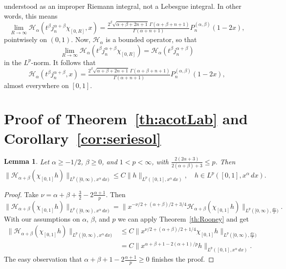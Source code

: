\documentclass[12pt,leqno]{amsart}
\theoremstyle{plain}
\newtheorem{Lem}[Thm]{Lemma}
\newcommand{\htr}{\mathcal{H}} %
\newcommand{\htra}{\mathcal{H}_\alpha} %
\begin{document}
understood as an improper Riemann integral, not a Lebesgue integral. In other
words, this means
\begin{equation*}
   \lim_{R\to\infty} \htra(t^\beta j_n^{\alpha+\beta} \chi_{[0,R]},x)
    = \tfrac{2^\beta \sqrt{\alpha+\beta+2n+1}\,\Gamma(\alpha+\beta+n+1)}
      {\Gamma(\alpha+n+1)}
      P_n^{(\alpha,\beta)}(1-2x),
\end{equation*}
pointwisely on $(0,1)$. Now, $\htra$ is a bounded operator, so that
\begin{equation*}
   \lim_{R\to\infty} \htra(t^\beta j_n^{\alpha+\beta} \chi_{[0,R]})
   = \htra(t^\beta j_n^{\alpha+\beta})
\end{equation*}
in the $L^p$-norm. It follows that
\begin{equation*}
   \htra(t^\beta j_n^{\alpha+\beta},x)
    = \tfrac{2^\beta \sqrt{\alpha+\beta+2n+1}\,\Gamma(\alpha+\beta+n+1)}
      {\Gamma(\alpha+n+1)}
      P_n^{(\alpha,\beta)}(1-2x),
\end{equation*}
almost everywhere on $[0,1]$.

\section{Proof of Theorem~\ref{th:acotLab} and Corollary~\ref{cor:seriesol}}
\label{sec:proofLab}

\begin{Lem}
\label{lem:acotopG}
Let $\alpha \geq {-1/2}$, $\beta\ge0$, and $1 < p < \infty$, with
$\tfrac{2(2\alpha+3)}{2(\alpha+\beta)+3} \leq p$.
Then
\begin{equation*}
  \|\htr_{\alpha+\beta}(\chi_{[0,1]} h)\|_{L^p([0,\infty),x^\alpha\,dx)}
   \leq C \| h \|_{L^p([0,1],x^\alpha\,dx)},
   \quad h \in L^p([0,1],x^\alpha\,dx).    
\end{equation*}
\end{Lem}

\begin{proof}
Take $\nu = \alpha + \beta + \tfrac32 - 2\tfrac{\alpha+1}p$. Then
\begin{equation*}
  \|\htr_{\alpha+\beta}(\chi_{[0,1]} h)\|_{L^p([0,\infty),x^\alpha\,dx)}
   = \| x^{-\nu/2 + (\alpha+\beta)/2 + 3/4}
   \htr_{\alpha+\beta}(\chi_{[0,1]} h)\|_{L^p([0,\infty),\tfrac{dx}x)}.
\end{equation*}
With our assumptions on $\alpha$, $\beta$, and $p$ we can apply
Theorem~\ref{th:Rooney} and get
\begin{align*}
  \|\htr_{\alpha+\beta}(\chi_{[0,1]} h)\|_{L^p([0,\infty),x^\alpha\,dx)}
  &\leq C \| x^{\nu/2 + (\alpha+\beta)/2 + 1/4}
   \chi_{[0,1]} h\|_{L^p([0,\infty),\tfrac{dx}x)}
   \\
  &= C 
  \| x^{\alpha+\beta+1-2(\alpha+1)/p} h\|_{L^p([0,1],x^\alpha \, dx)}.
\end{align*}
The easy observation that $\alpha+\beta+1-2\tfrac{\alpha+1}p \geq 0$ finishes
the proof.
\end{proof}
\end{document}
